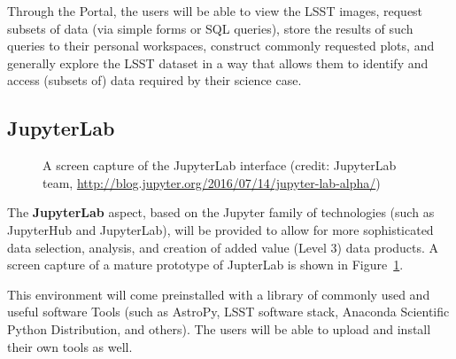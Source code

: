 \documentclass[DM,lsstdraft,toc]{lsstdoc}
\begin{document}
Through the Portal, the users will be
able to view the LSST images, request subsets of data (via simple forms or
SQL queries), store the results of such queries to their personal
workspaces, construct commonly requested plots, and generally explore the
LSST dataset in a way that allows them to identify and access (subsets of)
data required by their science case.

\subsection{JupyterLab}

\begin{figure}
	\centering
	\caption{A screen capture of the JupyterLab interface (credit: JupyterLab team, \url{http://blog.jupyter.org/2016/07/14/jupyter-lab-alpha/})
		\label{fig:JupyterLab}}
\end{figure}

The {\bf JupyterLab} aspect, based on the Jupyter family of technologies (such as
JupyterHub and JupyterLab), will be provided to allow for more sophisticated
data selection, analysis, and creation of added value (Level 3) data
products. A screen capture of a mature prototype of JupterLab is shown in 
Figure~\ref{fig:JupyterLab}.

This environment will come preinstalled with a library of
commonly used and useful software Tools (such as AstroPy, LSST software
stack, Anaconda Scientific Python Distribution, and others).  The users will
be able to upload and install their own tools as well.
\end{document}
